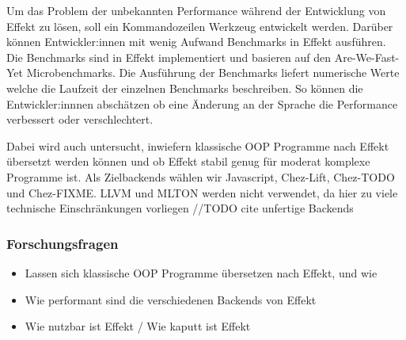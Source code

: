 Um das Problem der unbekannten Performance während der Entwicklung von Effekt zu lösen, soll ein Kommandozeilen Werkzeug entwickelt werden.
Darüber können Entwickler:innen mit wenig Aufwand Benchmarks in Effekt ausführen.
Die Benchmarks sind in Effekt implementiert und basieren auf den Are-We-Fast-Yet Microbenchmarks.
Die Ausführung der Benchmarks liefert numerische Werte welche die Laufzeit der einzelnen Benchmarks beschreiben. So können die Entwickler:innnen
abschätzen ob eine Änderung an der Sprache die Performance verbessert oder verschlechtert.

Dabei wird auch untersucht, inwiefern klassische OOP Programme nach Effekt übersetzt werden können und ob Effekt stabil genug für moderat komplexe Programme ist.  
Als Zielbackends wählen wir Javascript, Chez-Lift, Chez-TODO und Chez-FIXME.
LLVM und MLTON werden nicht verwendet, da hier zu viele technische Einschränkungen vorliegen //TODO cite unfertige Backends

\subsubsection{ Forschungsfragen }
\begin{itemize}
    \item Lassen sich klassische OOP Programme übersetzen nach Effekt, und wie
    \item Wie performant sind die verschiedenen Backends von Effekt
    \item Wie nutzbar ist Effekt / Wie kaputt ist Effekt
\end{itemize}


  